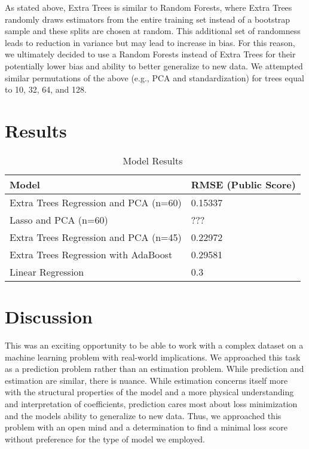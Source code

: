 \documentclass[11pt, oneside]{article}   	%
\begin{document}
As stated above, Extra Trees is similar to Random Forests, where Extra Trees randomly draws estimators from the entire training set instead of a bootstrap sample and these splits are chosen at random. This additional set of randomness leads to reduction in variance but may lead to increase in bias. For this reason, we ultimately decided to use a Random Forests instead of Extra Trees for their potentially lower bias and ability to better generalize to new data. We attempted similar permutations of the above (e.g., PCA and standardization) for trees equal to 10, 32, 64, and 128.

\section{Results}

\begin{table}[]
\centering

\label{my-label}
\begin{tabular}{@{}ll@{}}
\toprule
\textbf{Model} & \textbf{RMSE (Public Score)} \\ \midrule
Extra Trees Regression and PCA (n=60)  & 0.15337  \\
Lasso and PCA (n=60)  & ???  \\
Extra Trees Regression and PCA (n=45)   & 0.22972  \\
Extra Trees Regression with AdaBoost  & 0.29581  \\
Linear Regression & 0.3  \\ \bottomrule
\end{tabular}
\caption{Model Results}
\end{table}

\section{Discussion}
This was an exciting opportunity to be able to work with a complex dataset on a machine learning problem with real-world implications. We approached this task as a prediction problem rather than an estimation problem. While prediction and estimation are similar, there is nuance. While estimation concerns itself more with the structural properties of the model and a more physical understanding and interpretation of coefficients, prediction cares most about loss minimization and the models ability to generalize to new data. Thus, we approached this problem with an open mind and a determination to find a minimal loss score without preference for the type of model we employed. 
\end{document}
